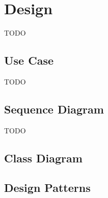 \section*{Design}
TODO

\subsection*{Use Case}
TODO

\subsection*{Sequence Diagram}
TODO

\subsection{Class Diagram}


\subsection*{Design Patterns}